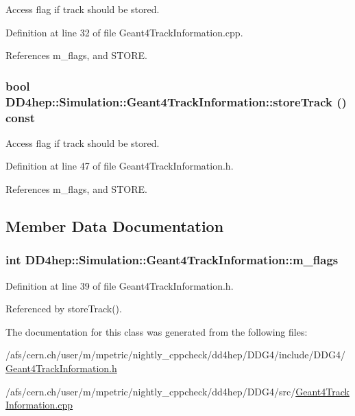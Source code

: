 Access flag if track should be stored. 

Definition at line 32 of file Geant4TrackInformation.cpp.

References m\_\-flags, and STORE.\hypertarget{class_d_d4hep_1_1_simulation_1_1_geant4_track_information_ab9e5fef91e20017e4e245f1c7c4f37cd}{
\subsubsection[{storeTrack}]{\setlength{\rightskip}{0pt plus 5cm}bool DD4hep::Simulation::Geant4TrackInformation::storeTrack () const}}
\label{class_d_d4hep_1_1_simulation_1_1_geant4_track_information_ab9e5fef91e20017e4e245f1c7c4f37cd}


Access flag if track should be stored. 

Definition at line 47 of file Geant4TrackInformation.h.

References m\_\-flags, and STORE.

\subsection{Member Data Documentation}
\hypertarget{class_d_d4hep_1_1_simulation_1_1_geant4_track_information_ad1b4800b1848a07c234c8b6657a6c4f3}{
\subsubsection[{m\_\-flags}]{\setlength{\rightskip}{0pt plus 5cm}int {\bf DD4hep::Simulation::Geant4TrackInformation::m\_\-flags}}}
\label{class_d_d4hep_1_1_simulation_1_1_geant4_track_information_ad1b4800b1848a07c234c8b6657a6c4f3}


Definition at line 39 of file Geant4TrackInformation.h.

Referenced by storeTrack().

The documentation for this class was generated from the following files:\begin{DoxyCompactItemize}
\item 
/afs/cern.ch/user/m/mpetric/nightly\_\-cppcheck/dd4hep/DDG4/include/DDG4/\hyperlink{_geant4_track_information_8h}{Geant4TrackInformation.h}\item 
/afs/cern.ch/user/m/mpetric/nightly\_\-cppcheck/dd4hep/DDG4/src/\hyperlink{_geant4_track_information_8cpp}{Geant4TrackInformation.cpp}\end{DoxyCompactItemize}
